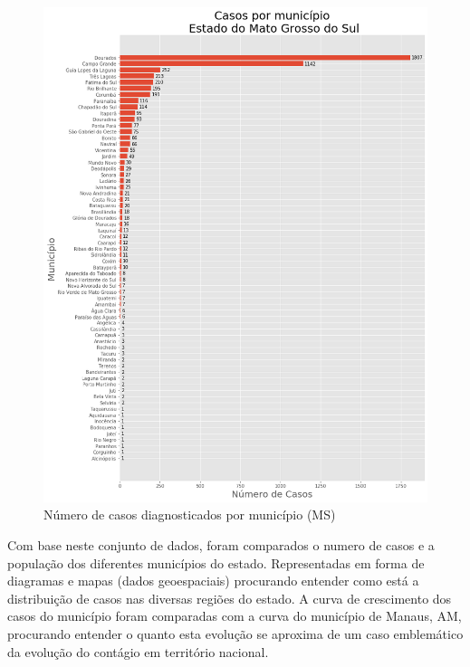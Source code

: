 \documentclass[12pt]{article}
\begin{document}
\begin{figure}[!htb]
  \centering
  \includegraphics[width=1\textwidth]{figs/casos_por_municipio.png}
  \caption{Número de casos diagnosticados por município (MS)}
  \label{fig:casosMuni}
  \end{figure}

Com base neste conjunto de dados, foram comparados o numero de casos e a população dos diferentes municípios do estado. Representadas em forma de diagramas e mapas (dados geoespaciais) procurando entender como está a distribuição de casos nas diversas regiões do estado. A curva de crescimento dos casos do município foram comparadas com a curva do município de Manaus, AM, procurando entender o quanto esta evolução se aproxima de um caso emblemático da evolução do contágio em território nacional.
\end{document}
